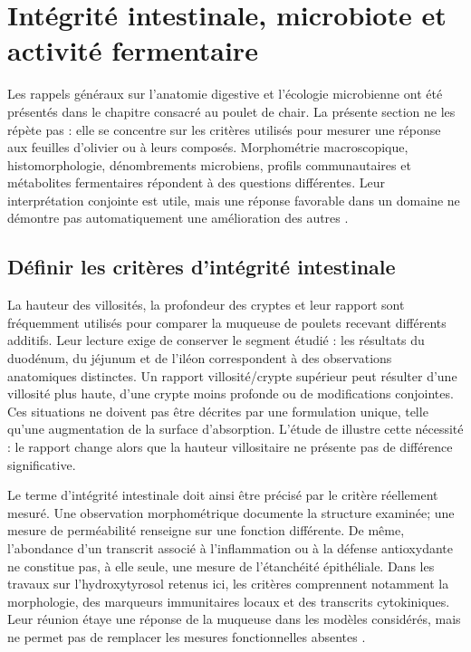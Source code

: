 \section{Intégrité intestinale, microbiote et activité fermentaire}

Les rappels généraux sur l'anatomie digestive et l'écologie microbienne ont été présentés dans le chapitre consacré au poulet de chair. La présente section ne les répète pas : elle se concentre sur les critères utilisés pour mesurer une réponse aux feuilles d'olivier ou à leurs composés. Morphométrie macroscopique, histomorphologie, dénombrements microbiens, profils communautaires et métabolites fermentaires répondent à des questions différentes. Leur interprétation conjointe est utile, mais une réponse favorable dans un domaine ne démontre pas automatiquement une amélioration des autres \citep{Erener2023,Pirman2021}.

\subsection{Définir les critères d'intégrité intestinale}

La hauteur des villosités, la profondeur des cryptes et leur rapport sont fréquemment utilisés pour comparer la muqueuse de poulets recevant différents additifs. Leur lecture exige de conserver le segment étudié : les résultats du duodénum, du jéjunum et de l'iléon correspondent à des observations anatomiques distinctes. Un rapport villosité/crypte supérieur peut résulter d'une villosité plus haute, d'une crypte moins profonde ou de modifications conjointes. Ces situations ne doivent pas être décrites par une formulation unique, telle qu'une augmentation de la surface d'absorption. L'étude de \citet{Dias2024} illustre cette nécessité : le rapport change alors que la hauteur villositaire ne présente pas de différence significative.

Le terme d'\og intégrité intestinale\fg{} doit ainsi être précisé par le critère réellement mesuré. Une observation morphométrique documente la structure examinée; une mesure de perméabilité renseigne sur une fonction différente. De même, l'abondance d'un transcrit associé à l'inflammation ou à la défense antioxydante ne constitue pas, à elle seule, une mesure de l'étanchéité épithéliale. Dans les travaux sur l'hydroxytyrosol retenus ici, les critères comprennent notamment la morphologie, des marqueurs immunitaires locaux et des transcrits cytokiniques. Leur réunion étaye une réponse de la muqueuse dans les modèles considérés, mais ne permet pas de remplacer les mesures fonctionnelles absentes \citep{Dias2024,Shan2022}.

